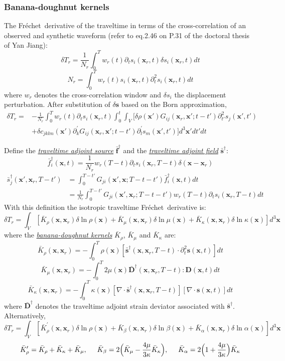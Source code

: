 \documentclass{article}
\newcommand{\mbf}[1]{\mathbf{#1}}
\newcommand{\mynem}[1]{\textsl{\uline{#1}}}
\newcommand{\Frechet}{Fr\'{e}chet~}
\begin{document}
\subsubsection{Banana-doughnut kernels}
The \Frechet derivative of the traveltime in terms of the cross-correlation of an observed and synthetic waveform (refer to eq.2.46 on P.31 of the doctoral thesis of Yan Jiang):
\[ \delta T_r=\frac{1}{N_r}\int_0^Tw_r(t)\partial_ts_i(\mbf x_r,t)\delta s_i(\mbf x_r,t)dt \]
\[ N_r=\int_0^Tw_r(t)s_i(\mbf x_r,t)\partial_t^2s_i(\mbf x_r,t)dt \]
where $w_r$ denotes the cross-correlation window and $\delta s_i$ the displacement perturbation. After substitution of $\delta\mbf s$ based on the Born approximation,
\begin{align*}
  \delta T_r= & -\frac{1}{N_r}\int_0^Tw_r(t)\partial_ts_i(\mbf x_r,t)\int_0^t\int_V[\delta\rho(\mbf x')G_{ij}(\mbf x_r,\mbf x';t-t')\partial_{t'}^2s_j(\mbf x',t') \\
    & +\delta c_{jklm}(\mbf x')\partial_k^\prime G_{ij}(\mbf x_r,\mbf x';t-t')\partial_l^\prime s_m(\mbf x',t')]d^3\mbf x'dt'dt
\end{align*}\par
Define the \mynem{traveltime adjoint source} $\bar{\mbf f}^\dagger$ and the \mynem{traveltime adjoint field} $\bar{\mbf s}^\dagger$:
\[ \bar f_i^\dagger(\mbf x,t)=\frac{1}{N_r}w_r(T-t)\partial_ts_i(\mbf x_r,T-t)\delta(\mbf x-\mbf x_r) \]
\begin{align*}
  \bar s_j^\dagger(\mbf x',\mbf x_r,T-t') & =\int_0^{T-t'}G_{ji}(\mbf x',\mbf x;T-t-t')\bar f_i^\dagger(\mbf x,t)dt \\
    & =\frac{1}{N_r}\int_0^{T-t'}G_{ji}(\mbf x',\mbf x_r;T-t-t')w_r(T-t)\partial_ts_i(\mbf x_r,T-t)dt
\end{align*}
With this definition the isotropic traveltime \Frechet derivative is:
\[ \delta T_r=\int_V[\bar K_\rho(\mbf x,\mbf x_r)\delta\ln\rho(\mbf x)+\bar K_\mu(\mbf x,\mbf x_r)\delta\ln\mu(\mbf x)+\bar K_\kappa(\mbf x,\mbf x_r)\delta\ln\kappa(\mbf x)]d^3\mbf x \]
where the \mynem{banana-doughnut kernels} $\bar K_\rho$, $\bar K_\mu$ and $\bar K_\kappa$ are:
\[ \bar K_\rho(\mbf x,\mbf x_r)=-\int_0^T\rho(\mbf x)[\bar{\mbf s}^\dagger(\mbf x,\mbf x_r,T-t)\cdot\partial_t^2\mbf s(\mbf x,t)]dt \]
\[ \bar K_\mu(\mbf x,\mbf x_r)=-\int_0^T2\mu(\mbf x)\bar{\mbf D}^\dagger(\mbf x,\mbf x_r,T-t):\mbf D(\mbf x,t)dt \]
\[ \bar K_\kappa(\mbf x,\mbf x_r)=-\int_0^T\kappa(\mbf x)[\nabla\cdot\bar{\mbf s}^\dagger(\mbf x,\mbf x_r,T-t)][\nabla\cdot\mbf s(\mbf x,t)]dt \]
where $\bar{\mbf D}^\dagger$ denotes the traveltime adjoint strain deviator associated with $\bar{\mbf s}^\dagger$. Alternatively,
\[ \delta T_r=\int_V[\bar K_\rho^\prime(\mbf x,\mbf x_r)\delta\ln\rho(\mbf x)+\bar K_\beta(\mbf x,\mbf x_r)\delta\ln\beta(\mbf x)+\bar K_\alpha(\mbf x,\mbf x_r)\delta\ln\alpha(\mbf x)]d^3\mbf x \]
\[ \bar K_\rho^\prime=\bar K_\rho+\bar K_\kappa+\bar K_\mu, \hspace{5mm} \bar K_\beta=2\Big(\bar K_\mu-\frac{4\mu}{3\kappa}\bar K_\kappa\Big), \hspace{5mm} \bar K_\alpha=2\Big(1+\frac{4\mu}{3\kappa}\Big)\bar K_\kappa \]\par
\end{document}
